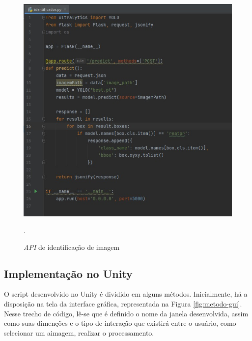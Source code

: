 \begin{figure}[!h]
    \centering
    \begin{minipage}{0.7\linewidth}
    \centering
    \captionsetup{justification=centering,margin=0.5cm,font=small}
    \includegraphics[width=1\linewidth]{img/cap5/API.jpeg}
    \caption{\textit{API} de identificação de imagem}.
    \label{fig:script-yolov8}
    \end{minipage}
\end{figure}


\subsection{Implementação no Unity}

O script desenvolvido no Unity é dividido em alguns métodos. Inicialmente, há a disposição na tela da interface gráfica, representada na Figura \ref{fig:metodo-gui}. Nesse trecho de código, lê-se que é definido o nome da janela desenvolvida, assim como suas dimenções e o tipo de interação que existirá entre o usuário, como selecionar um aimagem, realizar o processamento.

